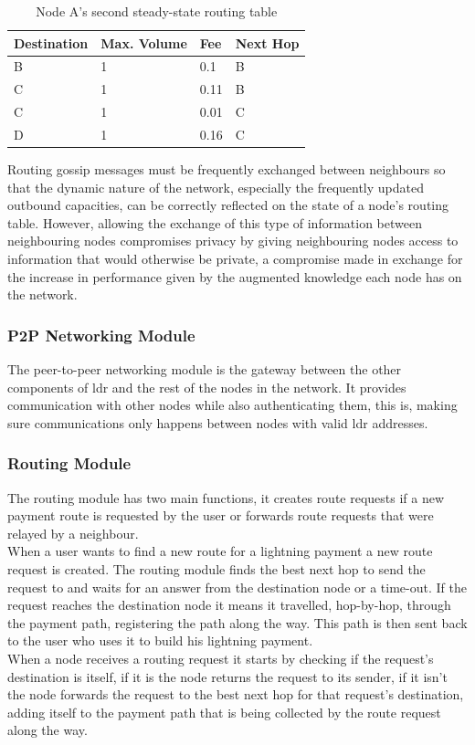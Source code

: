 \begin{table}[H]
\centering
\begin{tabular}{|l|l|l|l|}
\hline
\rowcolor[HTML]{C0C0C0} 
Destination & Max. Volume   & Fee   & Next Hop \\ \hline
B           & 1             & 0.1   & B       \\ \hline
C           & 1             & 0.11  & B       \\ \hline
C           & 1             & 0.01  & C       \\ \hline
D           & 1             & 0.16  & C       \\ \hline
\end{tabular}
\caption{Node A's second steady-state routing table}
\label{table:routing_table_steady_a_2}
\end{table}

Routing gossip messages must be frequently exchanged between neighbours so that the dynamic nature of the network, especially the frequently updated outbound capacities, can be correctly reflected on the state of a node's routing table. However, allowing the exchange of this type of information between neighbouring nodes compromises privacy by giving neighbouring nodes access to information that would otherwise be private, a compromise made in exchange for the increase in performance given by the augmented knowledge each node has on the network.

\subsubsection{P2P Networking Module}

The peer-to-peer networking module is the gateway between the other components of \acrshort{ldr} and the rest of the nodes in the network. It provides communication with other nodes while also authenticating them, this is, making sure communications only happens between nodes with valid \acrshort{ldr} addresses.

\subsubsection{Routing Module}

The routing module has two main functions, it creates route requests if a new payment route is requested by the user or forwards route requests that were relayed by a neighbour. \\
When a user wants to find a new route for a lightning payment a new route request is created. The routing module finds the best next hop to send the request to and waits for an answer from the destination node or a time-out. If the request reaches the destination node it means it travelled, hop-by-hop, through the payment path, registering the path along the way. This path is then sent back to the user who uses it to build his lightning payment. \\
When a node receives a routing request it starts by checking if the request's destination is itself, if it is the node returns the request to its sender, if it isn't the node forwards the request to the best next hop for that request's destination, adding itself to the payment path that is being collected by the route request along the way.